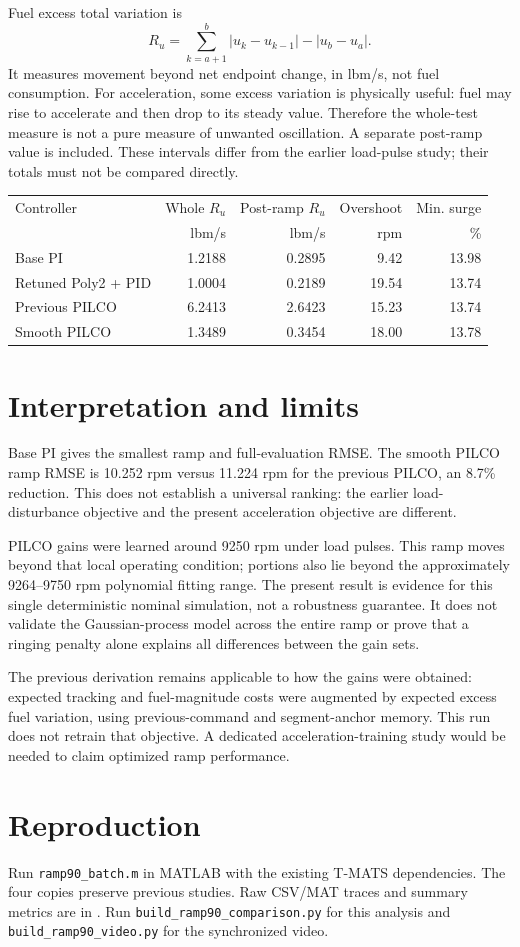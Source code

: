 \documentclass[11pt,a4paper]{article}
\begin{document}
Fuel excess total variation is
\begin{equation}R_u=\sum_{k=a+1}^{b}|u_k-u_{k-1}|-|u_b-u_a|.\end{equation}
It measures movement beyond net endpoint change, in lbm/s, not fuel consumption. For acceleration, some excess variation is physically useful: fuel may rise to accelerate and then drop to its steady value. Therefore the whole-test measure is not a pure measure of unwanted oscillation. A separate post-ramp value is included. These intervals differ from the earlier load-pulse study; their totals must not be compared directly.
\begin{center}\small\begin{tabular}{lrrrr}\toprule
Controller & Whole $R_u$ & Post-ramp $R_u$ & Overshoot & Min. surge\\
 & lbm/s & lbm/s & rpm & \%\\\midrule
Base PI & 1.2188 & 0.2895 & 9.42 & 13.98 \\
Retuned Poly2 + PID & 1.0004 & 0.2189 & 19.54 & 13.74 \\
Previous PILCO & 6.2413 & 2.6423 & 15.23 & 13.74 \\
Smooth PILCO & 1.3489 & 0.3454 & 18.00 & 13.78 \\
\bottomrule\end{tabular}\end{center}
\section{Interpretation and limits}
Base PI gives the smallest ramp and full-evaluation RMSE. The smooth PILCO ramp RMSE is 10.252 rpm versus 11.224 rpm for the previous PILCO, an 8.7\% reduction. This does not establish a universal ranking: the earlier load-disturbance objective and the present acceleration objective are different.

PILCO gains were learned around 9250 rpm under load pulses. This ramp moves beyond that local operating condition; portions also lie beyond the approximately 9264--9750 rpm polynomial fitting range. The present result is evidence for this single deterministic nominal simulation, not a robustness guarantee. It does not validate the Gaussian-process model across the entire ramp or prove that a ringing penalty alone explains all differences between the gain sets.

The previous derivation remains applicable to how the gains were obtained: expected tracking and fuel-magnitude costs were augmented by expected excess fuel variation, using previous-command and segment-anchor memory. This run does not retrain that objective. A dedicated acceleration-training study would be needed to claim optimized ramp performance.
\section{Reproduction}
Run \texttt{ramp90\_batch.m} in MATLAB with the existing T-MATS dependencies. The four  copies preserve previous studies. Raw CSV/MAT traces and summary metrics are in . Run \texttt{build\_ramp90\_comparison.py} for this analysis and \texttt{build\_ramp90\_video.py} for the synchronized video.
\end{document}
